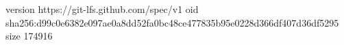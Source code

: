 version https://git-lfs.github.com/spec/v1
oid sha256:d99c0e6382e097ae0a8dd52fa0bc48ce477835b95e0228d366df407d36df5295
size 174916
